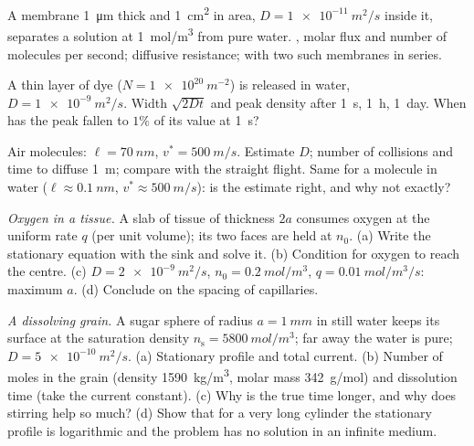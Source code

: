 \begin{exercise}[$\star$]\label{exo:b2:particle-diffusion:2}
A membrane \qty{1}{\micro m} thick and \qty{1}{cm^2} in area, $D =
\qty{1e-11}{m^2/s}$ inside it, separates a solution at \qty{1}{mol/m^3}
from pure water. , molar flux and number of molecules
per second; diffusive resistance; with two such membranes in series.
\end{exercise}

\begin{exercise}[$\star$]\label{exo:b2:particle-diffusion:3}
A thin layer of dye ($N = \qty{1e20}{m^{-2}}$) is released in water,
$D = \qty{1e-9}{m^2/s}$. Width $\sqrt{2Dt}$ and peak density after
\qty{1}{s}, \qty{1}{h}, \qty{1}{day}. When has the peak fallen to
$1\%$ of its value at \qty{1}{s}?
\end{exercise}

\begin{exercise}[$\star$]\label{exo:b2:particle-diffusion:4}
Air molecules: $\ell = \qty{70}{nm}$, $v^* = \qty{500}{m/s}$. Estimate
$D$; number of collisions and time to diffuse \qty{1}{m}; compare with
the straight flight. Same for a molecule in water ($\ell \approx
\qty{0.1}{nm}$, $v^* \approx \qty{500}{m/s}$): is the estimate right, and
why not exactly?
\end{exercise}

\begin{exercise}[$\star\star$]\label{exo:b2:particle-diffusion:5}
\emph{Oxygen in a tissue.} A slab of tissue of thickness $2a$ consumes
oxygen at the uniform rate $q$ (per unit volume); its two faces are
held at $n_0$. (a) Write the stationary equation with the sink and solve
it. (b) Condition for oxygen to reach the centre. (c) $D = \qty{2e-9}{m^2/s}$,
$n_0 = \qty{0.2}{mol/m^3}$, $q = \qty{0.01}{mol/m^3/s}$: maximum $a$. (d)
Conclude on the spacing of capillaries.
\end{exercise}

\begin{exercise}[$\star\star$]\label{exo:b2:particle-diffusion:6}
\emph{A dissolving grain.} A sugar sphere of radius $a = \qty{1}{mm}$
in still water keeps its surface at the saturation density $n_{\text{s}}
= \qty{5800}{mol/m^3}$; far away the water is pure; $D =
\qty{5e-10}{m^2/s}$. (a) Stationary profile and total current. (b)
Number of moles in the grain (density \qty{1590}{kg/m^3}, molar mass
\qty{342}{g/mol}) and dissolution time (take the current constant).
(c) Why is the true time longer, and why does stirring help so much?
(d) Show that for a very long cylinder the stationary profile is
logarithmic and the problem has no solution in an infinite medium.
\end{exercise}

